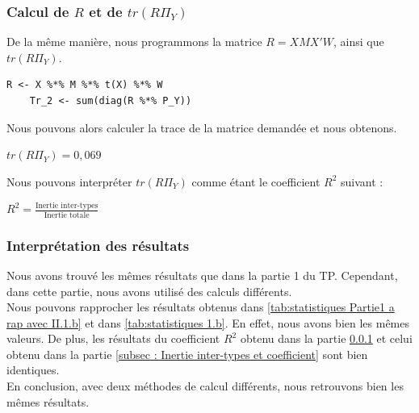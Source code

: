 \documentclass{article}
\begin{document}
\subsubsection{Calcul de $R$ et de $tr(R\Pi_Y)$ }
\label{subsec:Question 1.c}
De la même manière, nous programmons la matrice $R=XMX'W$, ainsi que $tr(R\Pi_Y)$.
\begin{lstlisting}[caption=Extrait du code R, label= Question 1c]
    R <- X %*% M %*% t(X) %*% W
    Tr_2 <- sum(diag(R %*% P_Y))
\end{lstlisting}
Nous pouvons alors calculer la trace de la matrice demandée et nous obtenons.
\begin{center}
    $tr(R\Pi_Y)=0,069$
\end{center}
Nous pouvons interpréter $tr(R\Pi_Y)$ comme étant le coefficient $R^2$ suivant :

\begin{center}
    $R^2 = \frac{\text{Inertie inter-types}}{\text{Inertie totale}}$
\end{center}


\subsubsection{Interprétation des résultats }
Nous avons trouvé les mêmes résultats que dans la partie 1 du TP. Cependant, dans cette partie, nous avons utilisé des calculs différents.\\
Nous pouvons rapprocher les résultats obtenus dans \autoref{tab:statistiques Partie1 a rap avec II.1.b} et dans \autoref{tab:statistiques 1.b}. En effet, nous avons bien
les mêmes valeurs. De plus, les résultats du coefficient $R^2$ obtenu dans la partie \ref{subsec:Question 1.c} et celui obtenu dans la partie \ref{subsec : Inertie inter-types et coefficient} sont bien identiques.
\\En conclusion, avec deux méthodes de calcul différents, nous retrouvons bien les mêmes résultats.
\end{document}
